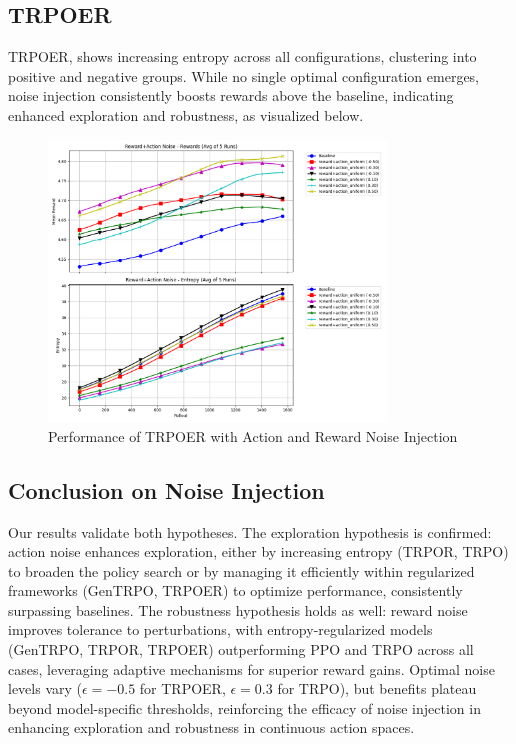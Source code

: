\documentclass{svproc}
\begin{document}
\subsection{TRPOER}

TRPOER, shows increasing entropy across all configurations, clustering into positive and negative groups. While no single optimal configuration emerges, noise injection consistently boosts rewards above the baseline, indicating enhanced exploration and robustness, as visualized below.

\vspace*{-\baselineskip}
\begin{figure}[H]
    \centering
    \includegraphics[width=0.8\textwidth]{.assets/TRPOER_100000_reward_action_5_runs_resmoothed.png}
    \caption{Performance of TRPOER with Action and Reward Noise Injection}
\end{figure}
\vspace*{-\baselineskip}

\subsection{Conclusion on Noise Injection}

Our results validate both hypotheses. The exploration hypothesis is confirmed: action noise enhances exploration, either by increasing entropy (TRPOR, TRPO) to broaden the policy search or by managing it efficiently within regularized frameworks (GenTRPO, TRPOER) to optimize performance, consistently surpassing baselines. The robustness hypothesis holds as well: reward noise improves tolerance to perturbations, with entropy-regularized models (GenTRPO, TRPOR, TRPOER) outperforming PPO and TRPO across all cases, leveraging adaptive mechanisms for superior reward gains. Optimal noise levels vary (\(\epsilon = -0.5\) for TRPOER, \(\epsilon = 0.3\) for TRPO), but benefits plateau beyond model-specific thresholds, reinforcing the efficacy of noise injection in enhancing exploration and robustness in continuous action spaces.


\newpage



\end{document}

